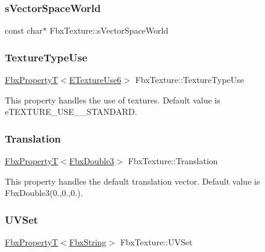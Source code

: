 \subsubsection{\texorpdfstring{s\+Vector\+Space\+World}{sVectorSpaceWorld}}
{\footnotesize\ttfamily const char$\ast$ Fbx\+Texture\+::s\+Vector\+Space\+World\hspace{0.3cm}{\ttfamily [static]}}

\mbox{\label{class_fbx_texture_a4813ec19bc568f47011cc1ce6c71f39e}} 
\subsubsection{\texorpdfstring{Texture\+Type\+Use}{TextureTypeUse}}
{\footnotesize\ttfamily \hyperlink{class_fbx_property_t}{Fbx\+PropertyT}$<$\hyperlink{class_fbx_texture_a321c489f8a8a5294298ffbf0ed361db9}{E\+Texture\+Use6}$>$ Fbx\+Texture\+::\+Texture\+Type\+Use}

This property handles the use of textures. Default value is e\+T\+E\+X\+T\+U\+R\+E\+\_\+\+U\+S\+E\+\_\+\_\+\+S\+T\+A\+N\+D\+A\+RD. \mbox{\label{class_fbx_texture_a94d73d8c789b8717b32ad5bba86ac42f}} 
\subsubsection{\texorpdfstring{Translation}{Translation}}
{\footnotesize\ttfamily \hyperlink{class_fbx_property_t}{Fbx\+PropertyT}$<$\hyperlink{fbxtypes_8h_ae0a96f14cde566774c7553aa7523b7a7}{Fbx\+Double3}$>$ Fbx\+Texture\+::\+Translation}

This property handles the default translation vector. Default value is Fbx\+Double3(0.,0.,0.). \mbox{\label{class_fbx_texture_ae28f2e1c33fa74ab1e9752f9de0be552}} 
\subsubsection{\texorpdfstring{U\+V\+Set}{UVSet}}
{\footnotesize\ttfamily \hyperlink{class_fbx_property_t}{Fbx\+PropertyT}$<$\hyperlink{class_fbx_string}{Fbx\+String}$>$ Fbx\+Texture\+::\+U\+V\+Set}

